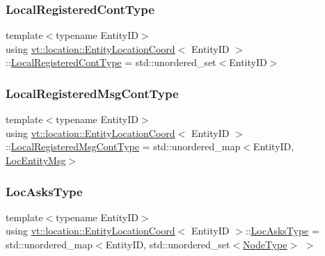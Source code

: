 \subsubsection{\texorpdfstring{Local\+Registered\+Cont\+Type}{LocalRegisteredContType}}
{\footnotesize\ttfamily template$<$typename Entity\+ID$>$ \\
using \hyperlink{structvt_1_1location_1_1_entity_location_coord}{vt\+::location\+::\+Entity\+Location\+Coord}$<$ Entity\+ID $>$\+::\hyperlink{structvt_1_1location_1_1_entity_location_coord_a90aee70e2e80fe4c1abf1d0616113708}{Local\+Registered\+Cont\+Type} =  std\+::unordered\+\_\+set$<$Entity\+ID$>$}

\mbox{\label{structvt_1_1location_1_1_entity_location_coord_a0c6d24fed6c690ac6d044b11d884df65}} 
\subsubsection{\texorpdfstring{Local\+Registered\+Msg\+Cont\+Type}{LocalRegisteredMsgContType}}
{\footnotesize\ttfamily template$<$typename Entity\+ID$>$ \\
using \hyperlink{structvt_1_1location_1_1_entity_location_coord}{vt\+::location\+::\+Entity\+Location\+Coord}$<$ Entity\+ID $>$\+::\hyperlink{structvt_1_1location_1_1_entity_location_coord_a0c6d24fed6c690ac6d044b11d884df65}{Local\+Registered\+Msg\+Cont\+Type} =  std\+::unordered\+\_\+map$<$Entity\+ID, \hyperlink{structvt_1_1location_1_1_entity_location_coord_ab0db07ed0b9f75712922733dd467b100}{Loc\+Entity\+Msg}$>$}

\mbox{\label{structvt_1_1location_1_1_entity_location_coord_a492ca5404229c05923f69bae396f2ac4}} 
\subsubsection{\texorpdfstring{Loc\+Asks\+Type}{LocAsksType}}
{\footnotesize\ttfamily template$<$typename Entity\+ID$>$ \\
using \hyperlink{structvt_1_1location_1_1_entity_location_coord}{vt\+::location\+::\+Entity\+Location\+Coord}$<$ Entity\+ID $>$\+::\hyperlink{structvt_1_1location_1_1_entity_location_coord_a492ca5404229c05923f69bae396f2ac4}{Loc\+Asks\+Type} =  std\+::unordered\+\_\+map$<$Entity\+ID, std\+::unordered\+\_\+set$<$\hyperlink{namespacevt_a866da9d0efc19c0a1ce79e9e492f47e2}{Node\+Type}$>$ $>$}

